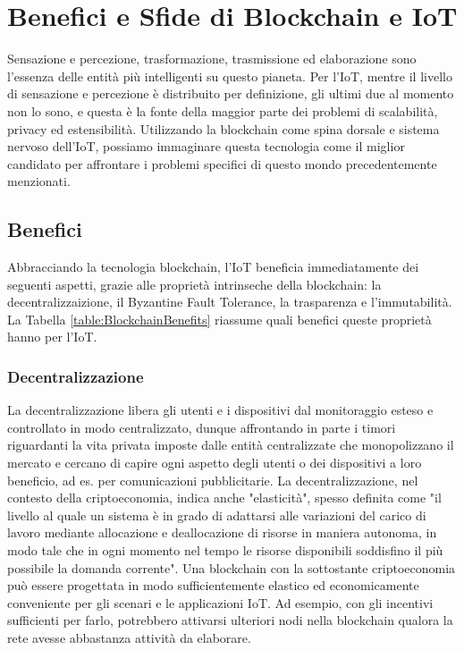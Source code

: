 \section{Benefici e Sfide di Blockchain e IoT}
Sensazione e percezione, trasformazione, trasmissione ed elaborazione sono l'essenza delle entità più intelligenti su questo pianeta. Per l'IoT, mentre il livello di sensazione e percezione è distribuito per definizione, gli ultimi due al momento non lo sono, e questa è la fonte della maggior parte dei problemi di scalabilità, privacy ed estensibilità. Utilizzando la blockchain come spina dorsale e sistema nervoso dell'IoT, possiamo immaginare questa tecnologia come il miglior candidato per affrontare i problemi specifici di questo mondo precedentemente menzionati.

\subsection{Benefici}
Abbracciando la tecnologia blockchain, l'IoT beneficia immediatamente dei seguenti aspetti, grazie alle proprietà intrinseche della blockchain: la decentralizzaizione, il Byzantine Fault Tolerance, la trasparenza e l'immutabilità. La Tabella \ref{table:BlockchainBenefits} riassume quali benefici queste proprietà hanno per l'IoT.


\subsubsection{Decentralizzazione}
La decentralizzazione libera gli utenti e i dispositivi dal monitoraggio esteso e controllato in modo centralizzato, dunque affrontando in parte i timori riguardanti la vita privata imposte dalle entità centralizzate che monopolizzano il mercato e cercano di capire ogni aspetto degli utenti o dei dispositivi a loro beneficio, ad es. per comunicazioni pubblicitarie. La decentralizzazione, nel contesto della criptoeconomia, indica anche "elasticità", spesso definita come "il livello al quale un sistema è in grado di adattarsi alle variazioni del carico di lavoro mediante allocazione e deallocazione di risorse in maniera autonoma, in modo tale che in ogni momento nel tempo le risorse disponibili soddisfino il più possibile la domanda corrente". Una blockchain con la sottostante criptoeconomia può essere progettata in modo sufficientemente elastico ed economicamente conveniente per gli scenari e le applicazioni IoT. Ad esempio, con gli  incentivi sufficienti per farlo, potrebbero attivarsi ulteriori nodi nella blockchain qualora la rete avesse abbastanza attività da elaborare.

